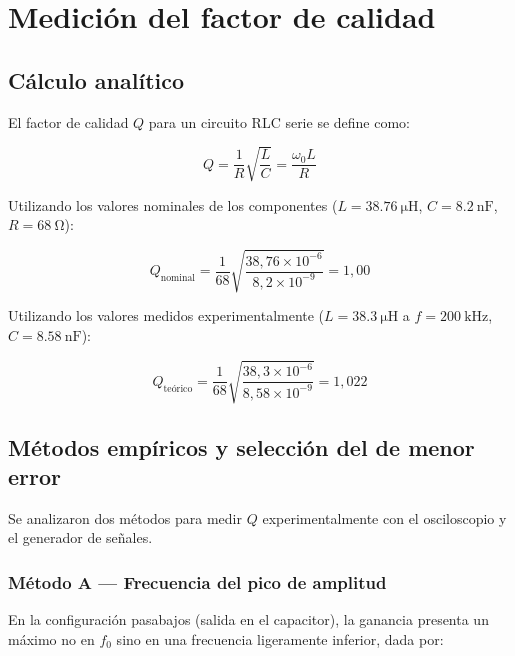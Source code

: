 \section{Medición del factor de calidad}

\subsection{Cálculo analítico}

El factor de calidad $Q$ para un circuito RLC serie se define como:

\begin{equation}
    Q = \frac{1}{R}\sqrt{\frac{L}{C}} = \frac{\omega_0 L}{R}
    \label{eq:Q_def}
\end{equation}

Utilizando los valores nominales de los componentes 
($L = \SI{38.76}{\micro\henry}$, $C = \SI{8.2}{\nano\farad}$, $R = \SI{68}{\ohm}$):

\begin{equation}
    Q_{\text{nominal}} = \frac{1}{68}\sqrt{\frac{38{,}76 \times 10^{-6}}{8{,}2 \times 10^{-9}}} = 1{,}00
    \label{eq:Q_nominal}
\end{equation}

Utilizando los valores medidos experimentalmente 
($L = \SI{38.3}{\micro\henry}$ a $f = \SI{200}{\kilo\hertz}$, $C = \SI{8.58}{\nano\farad}$):

\begin{equation}
    Q_{\text{teórico}} = \frac{1}{68}\sqrt{\frac{38{,}3 \times 10^{-6}}{8{,}58 \times 10^{-9}}} = 1{,}022
    \label{eq:Q_teo}
\end{equation}

\subsection{Métodos empíricos y selección del de menor error}

Se analizaron dos métodos para medir $Q$ experimentalmente con el osciloscopio 
y el generador de señales.

\subsubsection*{Método A — Frecuencia del pico de amplitud}

En la configuración pasabajos (salida en el capacitor), la ganancia presenta un 
máximo no en $f_0$ sino en una frecuencia ligeramente inferior, dada por:

